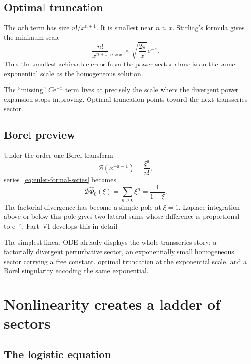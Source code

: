 \documentclass[11pt,oneside]{book}
\theoremstyle{definition}
\theoremstyle{remark}
\newcommand{\Borel}{\mathcal{B}}
\newcommand{\e}{\mathrm{e}}
\newcommand{\phihat}{\widehat{\Phi}}
\begin{document}
\section{Optimal truncation}

The $n$th term has size $n!/x^{n+1}$. It is smallest near $n\approx x$.
Stirling's formula gives the minimum scale
\[
  \frac{n!}{x^{n+1}}\bigg|_{n\approx x}
  \asymp \sqrt{\frac{2\pi}{x}}\,\e^{-x}.
\]
Thus the smallest achievable error from the power sector alone is on the same
exponential scale as the homogeneous solution.

\begin{bigidea}
The ``missing'' $C\e^{-x}$ term lives at precisely the scale where the divergent
power expansion stops improving. Optimal truncation points toward the next
transseries sector.
\end{bigidea}

\section{Borel preview}

Under the order-one Borel transform
\[
  \Borel\left(x^{-n-1}\right)=\frac{\xi^n}{n!},
\]
series~\eqref{eq:euler-formal-series} becomes
\begin{equation}
  \Borel\phihat_0(\xi)=\sum_{n\ge0}\xi^n=\frac1{1-\xi}.
  \label{eq:euler-borel}
\end{equation}
The factorial divergence has become a simple pole at $\xi=1$. Laplace
integration above or below this pole gives two lateral sums whose difference is
proportional to $\e^{-x}$. Part~VI develops this in detail.

\begin{summarybox}
The simplest linear ODE already displays the whole transseries story: a
factorially divergent perturbative sector, an exponentially small homogeneous
sector carrying a free constant, optimal truncation at the exponential scale,
and a Borel singularity encoding the same exponential.
\end{summarybox}

\chapter{Nonlinearity creates a ladder of sectors}
\label{ch:nonlinear-ode}

\section{The logistic equation}
\end{document}
